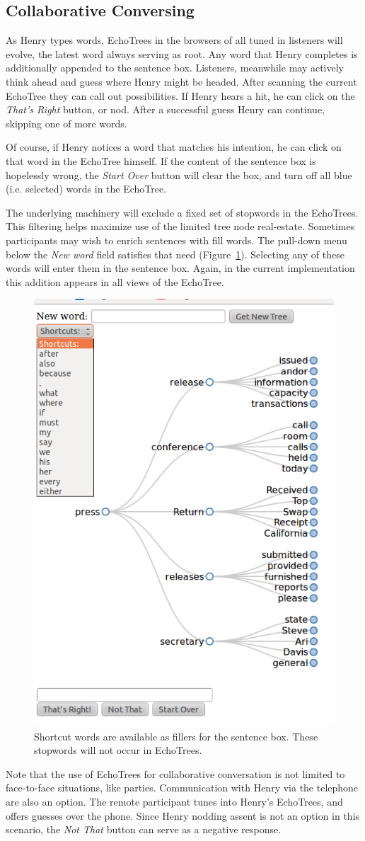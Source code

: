 \documentclass{sigchi}
\begin{document}
\subsection{Collaborative Conversing}
As Henry types words, EchoTrees in the browsers of all tuned in
listeners will evolve, the latest word always serving as root. Any
word that Henry completes is additionally appended to the sentence
box. Listeners, meanwhile may actively think ahead and guess where
Henry might be headed. After scanning the current EchoTree they can
call out possibilities. If Henry hears a hit, he can click on the {\em
  That's Right} button, or nod. After a successful guess Henry can
continue, skipping one of more words.

Of course, if Henry notices a word that matches his intention, he can
click on that word in the EchoTree himself. If the content of the
sentence box is hopelessly wrong, the {\em Start Over} button will
clear the box, and turn off all blue (i.e. selected) words in the
EchoTree. 

The underlying machinery will exclude a fixed set of stopwords in the
EchoTrees. This filtering helps maximize use of the limited tree node
real-estate. Sometimes participants may wish to enrich sentences with
fill words. The pull-down menu below the {\em New word} field
satisfies that need (Figure~\ref{fig:shortcuts}). Selecting any of
these words will enter them in the sentence box. Again, in the current
implementation this addition appears in all views of the EchoTree.
\begin{figure}
   \centering
   \includegraphics[width=0.4\columnwidth]{Figs/echoTreePulldownSnapshotSmall.png}
   \caption{Shortcut words are available as fillers for the sentence
     box. These stopwords will not occur in EchoTrees.}
   \label{fig:shortcuts}
\end{figure}
Note that the use of EchoTrees for collaborative conversation is not
limited to face-to-face situations, like parties. Communication
with Henry via the telephone are also an option. The remote
participant tunes into Henry's EchoTrees, and offers guesses over the
phone. Since Henry nodding assent is not an option in this scenario,
the {\em Not That} button can serve as a negative response.
\end{document}
